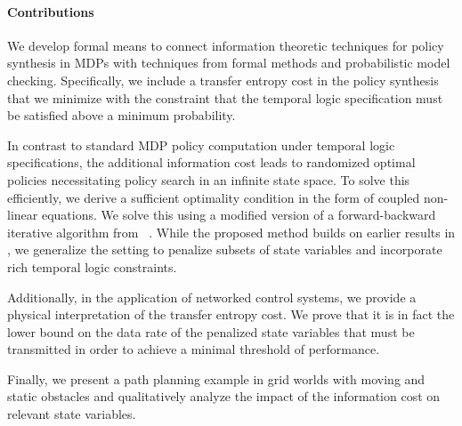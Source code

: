 \paragraph*{\textbf{Contributions}} We develop formal means to connect information theoretic techniques for policy synthesis in MDPs with techniques from formal methods and probabilistic model checking. Specifically, we include a transfer entropy cost in the policy synthesis that we  minimize with the constraint that the temporal logic specification must be satisfied above a minimum probability. 

In contrast to standard MDP policy computation under temporal logic specifications, the additional information cost leads to randomized optimal policies \cite{tanaka2017lqg,Todorov09,takashi17} necessitating policy search in an infinite state space. To solve this efficiently, we derive a sufficient optimality condition in the form of coupled non-linear equations. We solve this using a modified version of a forward-backward iterative algorithm from ~\cite{Blahut72}. While the proposed method builds on earlier results in \cite{takashi17}, we generalize the setting to penalize subsets of state variables and incorporate rich temporal logic constraints. 

Additionally, in the application of networked control systems, we provide a physical interpretation of the transfer entropy cost. We prove that it is in fact the lower bound on the data rate of the penalized state variables that must be transmitted in order to achieve a minimal threshold of performance.

Finally, we present a path planning example in grid worlds with moving and static obstacles and qualitatively analyze the impact of the information cost on relevant state variables.



